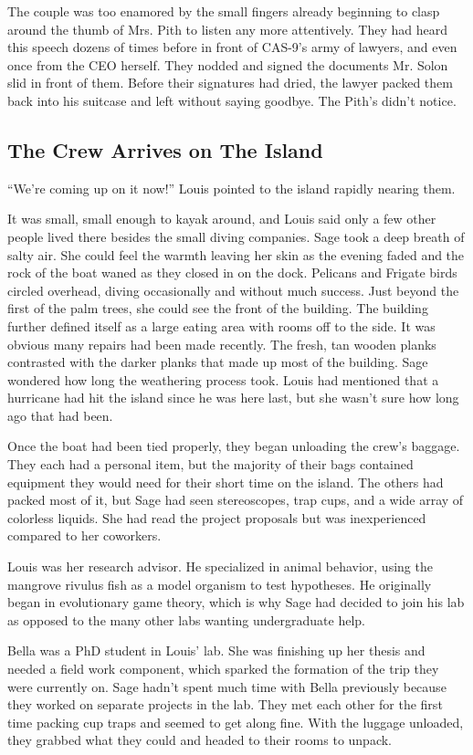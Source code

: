 \documentclass[12pt, fleqn, AofM.tex]{subfiles}
\begin{document}
The couple was too enamored by the small fingers already beginning to clasp around the thumb of Mrs. Pith to listen any more attentively. They had heard this speech dozens of times before in front of CAS-9's army of lawyers, and even once from the CEO herself. They nodded and signed the documents Mr. Solon slid in front of them. Before their signatures had dried, the lawyer packed them back into his suitcase and left without saying goodbye. The Pith's didn't notice.


\subsection{The Crew Arrives on The Island}

“We're coming up on it now!” Louis pointed to the island rapidly nearing them.

It was small, small enough to kayak around, and Louis said only a few other people lived there besides the small diving companies. Sage took a deep breath of salty air. She could feel the warmth leaving her skin as the evening faded and the rock of the boat waned as they closed in on the dock. Pelicans and Frigate birds circled overhead, diving occasionally and without much success. Just beyond the first of the palm trees, she could see the front of the building. The building further defined itself as a large eating area with rooms off to the side. It was obvious many repairs had been made recently. The fresh, tan wooden planks contrasted with the darker planks that made up most of the building. Sage wondered how long the weathering process took. Louis had mentioned that a hurricane had hit the island since he was here last, but she wasn't sure how long ago that had been.

Once the boat had been tied properly, they began unloading the crew's baggage. They each had a personal item, but the majority of their bags contained equipment they would need for their short time on the island. The others had packed most of it, but Sage had seen stereoscopes, trap cups, and a wide array of colorless liquids. She had read the project proposals but was inexperienced compared to her coworkers.

Louis was her research advisor. He specialized in animal behavior, using the mangrove rivulus fish as a model organism to test hypotheses. He originally began in evolutionary game theory, which is why Sage had decided to join his lab as opposed to the many other labs wanting undergraduate help.

Bella was a PhD student in Louis' lab. She was finishing up her thesis and needed a field work component, which sparked the formation of the trip they were currently on. Sage hadn't spent much time with Bella previously because they worked on separate projects in the lab. They met each other for the first time packing cup traps and seemed to get along fine. With the luggage unloaded, they grabbed what they could and headed to their rooms to unpack.
 
\end{document}
